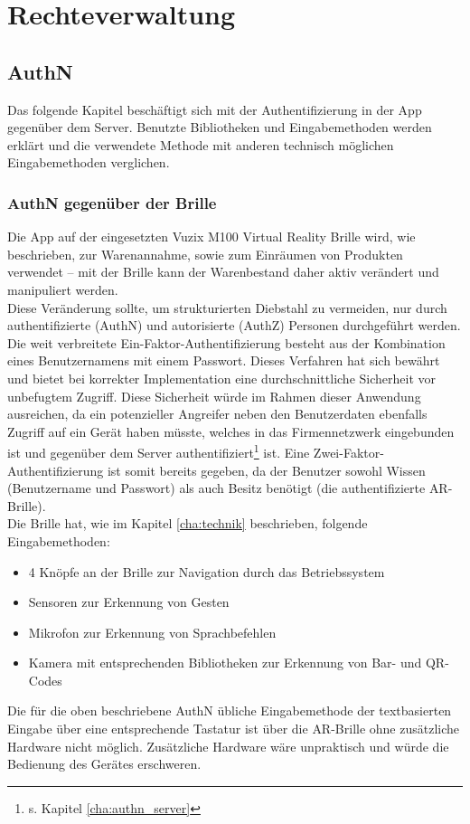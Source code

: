 \section{Rechteverwaltung}
\label{cha:rechteverwaltung_vr}

\subsection{\acf{AuthN}}
Das folgende Kapitel beschäftigt sich mit der Authentifizierung in der App gegenüber dem Server. Benutzte Bibliotheken und Eingabemethoden werden erklärt und die verwendete Methode mit anderen technisch möglichen Eingabemethoden verglichen.

\subsubsection{\acs{AuthN} gegenüber der Brille}
Die App auf der eingesetzten Vuzix M100 Virtual Reality Brille wird, wie beschrieben, zur Warenannahme, sowie zum Einräumen von Produkten verwendet -- mit der Brille kann der Warenbestand daher aktiv verändert und manipuliert werden.\\
Diese Veränderung sollte, um \zB strukturierten Diebstahl zu vermeiden, nur durch authentifizierte (\acs{AuthN}) und autorisierte (\acs{AuthZ}) Personen durchgeführt werden.\\

Die weit verbreitete Ein-Faktor-Authentifizierung besteht aus der Kombination eines Benutzernamens mit einem Passwort. Dieses Verfahren hat sich bewährt und bietet bei korrekter Implementation eine durchschnittliche Sicherheit vor unbefugtem Zugriff. Diese Sicherheit würde im Rahmen dieser Anwendung ausreichen, da ein potenzieller Angreifer neben den Benutzerdaten ebenfalls Zugriff auf ein Gerät haben müsste, welches in das Firmennetzwerk eingebunden ist und gegenüber dem Server authentifiziert\footnote{s. Kapitel \ref{cha:authn_server}} ist. Eine Zwei-Faktor-Authentifizierung ist somit bereits gegeben, da der Benutzer sowohl Wissen (Benutzername und Passwort) als auch Besitz benötigt (die authentifizierte \acl{AR}-Brille).\\

Die Brille hat, wie im Kapitel \ref{cha:technik} beschrieben, folgende Eingabemethoden:
\begin{itemize}
	\item 4 Knöpfe an der Brille zur Navigation durch das Betriebssystem
	\item Sensoren zur Erkennung von Gesten
	\item Mikrofon zur Erkennung von Sprachbefehlen
	\item Kamera mit entsprechenden Bibliotheken zur Erkennung von Bar- und QR-Codes
\end{itemize}
Die für die oben beschriebene \acf{AuthN} übliche Eingabemethode der textbasierten Eingabe über eine entsprechende Tastatur ist über die \ac{AR}-Brille ohne zusätzliche Hardware nicht möglich. Zusätzliche Hardware wäre unpraktisch und würde die Bedienung des Gerätes erschweren.\\

